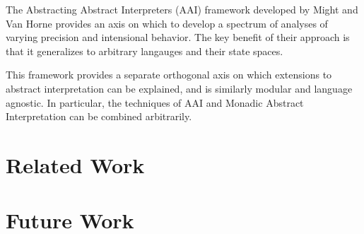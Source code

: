 \documentclass{article}
\begin{document}
The Abstracting Abstract Interpreters (AAI) framework developed by Might and
Van Horne provides an axis on which to develop a spectrum of analyses of
varying precision and intensional behavior.
%
The key benefit of their approach is that it generalizes to arbitrary langauges
and their state spaces.

This framework provides a separate orthogonal axis on which extensions to
abstract interpretation can be explained, and is similarly modular and language
agnostic.
%
In particular, the techniques of AAI and Monadic Abstract Interpretation can be
combined arbitrarily.


\section{Related Work}


\section{Future Work}
\end{document}
